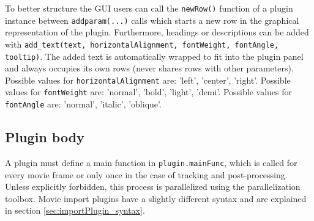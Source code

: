 \documentclass[11pt,onside]{report}
\numberwithin{equation}{chapter}
\begin{document}
To  better structure the GUI users can call the \texttt{newRow()} function of a plugin instance between \texttt{add\textunderscore param(...)} calls which starts a new row in the graphical representation of the plugin. Furthermore, headings or descriptions can be added with \texttt{add\_text(text, horizontalAlignment, fontWeight, fontAngle, tooltip)}. The added text is automatically wrapped to fit into the plugin panel and always occupies its own rows (never shares rows with other parameters).   Possible values for \texttt{horizontalAlignment} are: 'left', 'center', 'right'.  Possible values for \texttt{fontWeight} are: 'normal', 'bold', 'light', 'demi'. Possible values for \texttt{fontAngle} are: 'normal', 'italic', 'oblique'.

\subsection{Plugin body}
A plugin must define a main function in \texttt{plugin.mainFunc}, which is called for every movie frame or only once in the case of tracking and post-processing. Unless explicitly forbidden, this process is parallelized using the parallelization toolbox. Movie import plugins have a slightly different syntax and are explained in section \ref{sec:importPlugin_syntax}.
\end{document}
